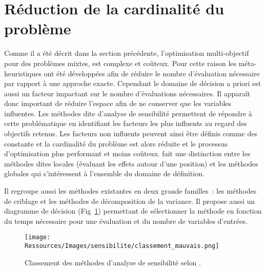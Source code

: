 



\section{Réduction de la cardinalité du problème} %
\label{sec:reduction_de_la_cardinalite_du_probleme}


Comme il a été décrit dans la section précédente, l’optimisation multi-objectif pour
des problèmes mixtes, est complexe et coûteux. Pour cette raison les méta-heuristiques
ont été développées afin de réduire le nombre d’évaluation nécessaire par rapport à
une approche exacte.
Cependant le domaine de décision a priori est aussi un facteur impactant sur le
nombre d’évaluations nécessaires. Il apparaît donc important de réduire l’espace
afin de ne conserver que les variables influentes.
Les méthodes dite d’analyse de sensibilité permettent de répondre à cette problématique
en identifiant les facteurs les plus influents au regard des objectifs retenus.
Les facteurs non influents peuvent ainsi être définis comme des constante et la cardinalité
du problème est alors réduite et le processus d’optimisation plus performant et moins coûteux.
\cite{Iooss2011} fait une distinction entre les méthodes dites locales
(évaluant les effets autour d’une position) et les méthodes globales qui
s’intéressent à l’ensemble du domaine de définition.

Il regroupe aussi les méthodes existantes en deux grande familles~: les
méthodes de criblage et les méthodes de décomposition de la variance. Il propose
aussi un diagramme de décision (Fig~\ref{fig:classement_methode}) permettant de
sélectionner la méthode en fonction du temps nécessaire pour une évaluation et
du nombre de variables d’entrées.

\begin{figure}
    \begin{center}
        \texttt{[image: Ressources/Images/sensibilite/classement\_mauvais.png]}
    \end{center}
    \caption{Classement des méthodes d’analyse de sensibilité selon \cite{Iooss2011}.
             \label{fig:classement_methode}}
\end{figure}


